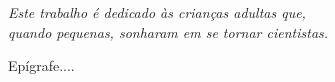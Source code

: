 \begin{dedicatoria}
   \vspace*{\fill}
   \centering
   \noindent
   \textit{ Este trabalho é dedicado às crianças adultas que,\\
   quando pequenas, sonharam em se tornar cientistas.} \vspace*{\fill}
\end{dedicatoria}

\begin{agradecimentos}


\end{agradecimentos}

\begin{epigrafe}
    \vspace*{\fill}
	\begin{flushright}
	   Epígrafe....
	\end{flushright}
\end{epigrafe}

